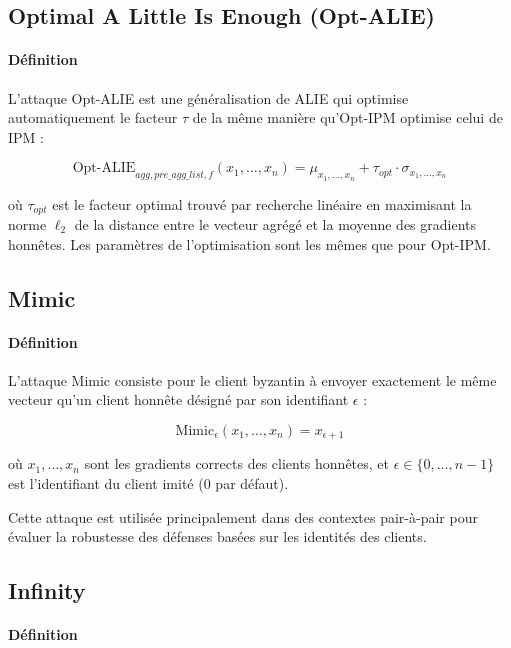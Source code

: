 \documentclass[a4paper,11pt]{article}
\begin{document}
\subsection{Optimal A Little Is Enough (Opt-ALIE)}

\paragraph{Définition}

L'attaque Opt-ALIE est une généralisation de ALIE qui optimise automatiquement le facteur $\tau$ de la même manière qu'Opt-IPM optimise celui de IPM :

\[
\mathrm{Opt\text{-}ALIE}_{\mathit{agg},\mathit{pre\_agg\_list},f}(x_1,\dots,x_n) = \mu_{x_1,\dots,x_n} + \tau_{opt} \cdot \sigma_{x_1,\dots,x_n}
\]

où $\tau_{opt}$ est le facteur optimal trouvé par recherche linéaire en maximisant la norme $\ell_2$ de la distance entre le vecteur agrégé et la moyenne des gradients honnêtes. Les paramètres de l'optimisation sont les mêmes que pour Opt-IPM.

\subsection{Mimic}

\paragraph{Définition}

L'attaque Mimic consiste pour le client byzantin à envoyer exactement le même vecteur qu'un client honnête désigné par son identifiant $\epsilon$ :

\[
\mathrm{Mimic}_\epsilon(x_1,\dots,x_n) = x_{\epsilon+1}
\]

où $x_1,\dots,x_n$ sont les gradients corrects des clients honnêtes, et $\epsilon \in \{0,\dots,n-1\}$ est l'identifiant du client imité (0 par défaut).

Cette attaque est utilisée principalement dans des contextes pair-à-pair pour évaluer la robustesse des défenses basées sur les identités des clients.

\subsection{Infinity}

\paragraph{Définition}
\end{document}
